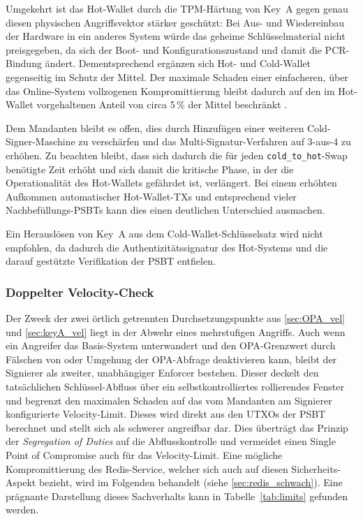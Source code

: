 Umgekehrt ist das Hot-Wallet durch die TPM-Härtung von Key~A gegen genau diesen physischen Angriffsvektor stärker geschützt: Bei Aus- und Wiedereinbau der Hardware in ein anderes System würde das geheime Schlüsselmaterial nicht preisgegeben, da sich der Boot- und Konfigurationszustand und damit die \ac{PCR}-Bindung ändert.
Dementsprechend ergänzen sich Hot- und Cold-Wallet gegenseitig im Schutz der Mittel. Der maximale Schaden einer einfacheren, über das Online-System vollzogenen Kompromittierung bleibt dadurch auf den im Hot-Wallet vorgehaltenen Anteil von circa 5\,\% der Mittel beschränkt \cite{nist_zero_trust}.

Dem Mandanten bleibt es offen, dies durch Hinzufügen einer weiteren Cold-Signer-Maschine zu verschärfen und das Multi-Signatur-Verfahren auf 3-aus-4 zu erhöhen. Zu beachten bleibt, dass sich dadurch die für jeden \texttt{cold\_to\_hot}-Swap benötigte Zeit erhöht und sich damit die kritische Phase, in der die Operationalität des Hot-Wallets gefährdet ist, verlängert. Bei einem erhöhten Aufkommen automatischer Hot-Wallet-\acp{TX} und entsprechend vieler Nachbefüllungs-\acp{PSBT} kann dies einen deutlichen Unterschied ausmachen.

Ein Herauslösen von Key~A aus dem Cold-Wallet-Schlüsselsatz wird nicht empfohlen, da dadurch die Authentizitätssignatur des Hot-Systems und die darauf gestützte Verifikation der \ac{PSBT} entfielen.

\subsubsection{Doppelter Velocity-Check} \label{sec:doppelter_velocity}
Der Zweck der zwei örtlich getrennten Durchsetzungspunkte aus \ref{sec:OPA_vel} und \ref{sec:keyA_vel} liegt in der Abwehr eines mehrstufigen Angriffs. 
Auch wenn ein Angreifer das Basis-System unterwandert und den \ac{OPA}-Grenzwert durch Fälschen von \texttt{} oder Umgehung der \ac{OPA}-Abfrage deaktivieren kann, bleibt der Signierer als zweiter, unabhängiger Enforcer bestehen.
Dieser deckelt den tatsächlichen Schlüssel-Abfluss über ein selbstkontrolliertes rollierendes Fenster und begrenzt den maximalen Schaden auf das vom Mandanten am Signierer konfigurierte Velocity-Limit. Dieses wird direkt aus den \acp{UTXO} der \ac{PSBT} berechnet und stellt sich als schwerer angreifbar dar. Dies überträgt das Prinzip der \emph{Segregation of Duties} auf die Abflusskontrolle und vermeidet einen Single Point of Compromise auch für das Velocity-Limit.
Eine mögliche Kompromittierung des Redis-Service, welcher sich auch auf diesen Sicherheits-Aspekt bezieht, wird im Folgenden behandelt (siehe \ref{sec:redis_schwach}).
Eine prägnante Darstellung dieses Sachverhalts kann in Tabelle~\ref{tab:limits} gefunden werden.

